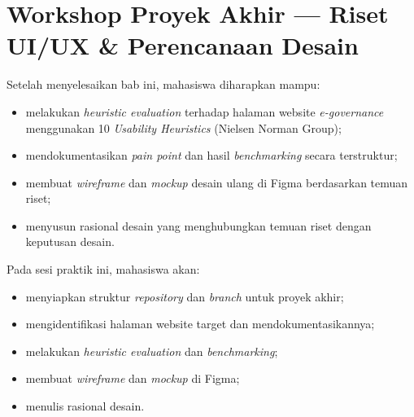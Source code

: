 
\chapter{Workshop Proyek Akhir --- Riset UI/UX \& Perencanaan Desain}
\label{chap:minggu-14}

\begin{capaian}
Setelah menyelesaikan bab ini, mahasiswa diharapkan mampu:
\begin{itemize}
  \item melakukan \emph{heuristic evaluation} terhadap halaman website \emph{e-governance} menggunakan 10 \emph{Usability Heuristics} (Nielsen Norman Group);
  \item mendokumentasikan \emph{pain point} dan hasil \emph{benchmarking} secara terstruktur;
  \item membuat \emph{wireframe} dan \emph{mockup} desain ulang di Figma berdasarkan temuan riset;
  \item menyusun rasional desain yang menghubungkan temuan riset dengan keputusan desain.
\end{itemize}
\end{capaian}

\begin{tujuanpraktik}
Pada sesi praktik ini, mahasiswa akan:
\begin{itemize}
  \item menyiapkan struktur \emph{repository} dan \emph{branch} untuk proyek akhir;
  \item mengidentifikasi halaman website target dan mendokumentasikannya;
  \item melakukan \emph{heuristic evaluation} dan \emph{benchmarking};
  \item membuat \emph{wireframe} dan \emph{mockup} di Figma;
  \item menulis rasional desain.
\end{itemize}
\end{tujuanpraktik}

